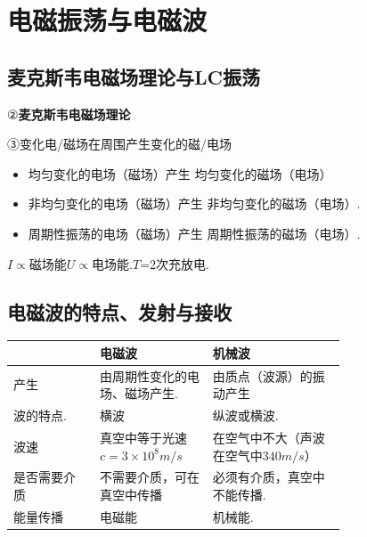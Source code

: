 \chapter{电磁振荡与电磁波}
\label{ch:14}

\section{麦克斯韦电磁场理论与LC振荡}
②\quad \textbf{麦克斯韦电磁场理论}

③\quad 变化电/磁场在周围产生变化的磁/电场 %

\begin{itemize}
\item 均匀变化的电场（磁场）产生 均匀变化的磁场（电场） %
\item 非均匀变化的电场（磁场）产生 非均匀变化的磁场（电场）.
\item 周期性振荡的电场（磁场）产生 周期性振荡的磁场（电场）.
\end{itemize}

$I\propto$磁场能\qquad $U\propto$电场能.\qquad $T$=2次充放电.




\section{电磁波的特点、发射与接收}
\begin{center}
\begin{tabular}{@{}lp{0.34\linewidth}p{0.4\linewidth}@{}}
\toprule
 & 电磁波 & 机械波 \\
\midrule
产生 & 由周期性变化的电场、磁场产生. & 由质点（波源）的振动产生 \\
波的特点. & 横波 & 纵波或横波. \\
波速 & 真空中等于光速$c=3\times10^{8}\unit{m/s}$ & 在空气中不大（声波在空气中$340\unit{m/s}$） \\
是否需要介质 & 不需要介质，可在真空中传播 & 必须有介质，真空中不能传播. \\
能量传播 & 电磁能 & 机械能. \\
\bottomrule
\end{tabular}
\end{center}

